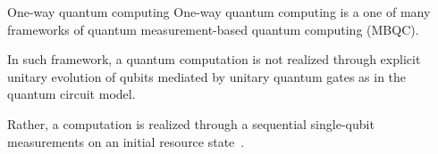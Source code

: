 \documentclass[final]{beamer}
\newlength{\sepwidth}
\newlength{\colwidth}
\newcommand{\separatorcolumn}{\begin{column}{\sepwidth}\end{column}}
\begin{document}
    \begin{frame}[t]
        \begin{columns}[t]
            \separatorcolumn

            \begin{column}{\colwidth}
                \begin{block}{One-way quantum computing}
                    One-way quantum computing is a one of many frameworks of quantum
                    measurement-based quantum computing (MBQC).

                    In such framework, a quantum computation is not realized through explicit
                    unitary evolution of qubits mediated by unitary quantum gates as in the
                    quantum circuit model.

                    Rather, a computation is realized through a sequential single-qubit
                    measurements on an initial resource
                    state~\cite{PhysRevA.68.022312}.

                    \begin{figure}[H]
                        \centering
\end{figure}
\end{block}
\end{column}
\end{columns}
\end{frame}
\end{document}
